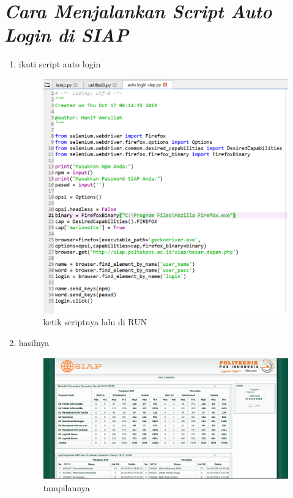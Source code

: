 \section*{\textit{Cara Menjalankan Script Auto Login di SIAP}}
\begin{enumerate}
\item ikuti script auto login
		\begin{figure}[h]
			\includegraphics[width=14cm]{figure/siap1.png}
			\centering
			\caption{ketik scriptnya lalu di RUN}
			\end{figure}
\item hasilnya
		\begin{figure}[h]
			\includegraphics[scale=0.55]{figure/siap2.png}
			\centering
			\caption{tampilannya}
			\end{figure}
\end{enumerate}

